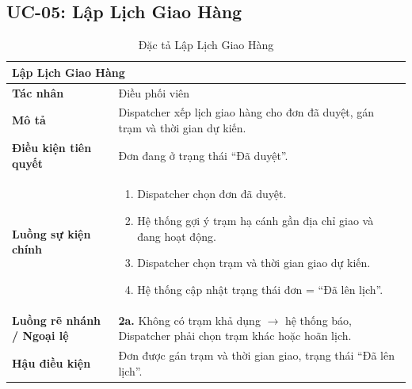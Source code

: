 \subsection{UC-05: Lập Lịch Giao Hàng}
\begin{table}[H]
  \centering
  \begin{tabularx}{\textwidth}{|l|X|}
    \hline
    \multicolumn{2}{|l|}{\textbf{Lập Lịch Giao Hàng}} \\
    \hline
    \textbf{Tác nhân}           & Điều phối viên \\ \hline
    \textbf{Mô tả}              & Dispatcher xếp lịch giao hàng cho đơn đã duyệt, gán trạm và thời gian dự kiến. \\ \hline
    \textbf{Điều kiện tiên quyết} & Đơn đang ở trạng thái ``Đã duyệt''. \\ \hline
    \textbf{Luồng sự kiện chính} &
      \begin{enumerate}[leftmargin=*, nosep, topsep=0pt]
        \item Dispatcher chọn đơn đã duyệt.
        \item Hệ thống gợi ý trạm hạ cánh gần địa chỉ giao và đang hoạt động.
        \item Dispatcher chọn trạm và thời gian giao dự kiến.
        \item Hệ thống cập nhật trạng thái đơn = ``Đã lên lịch''.
      \end{enumerate} \\ \hline
    \textbf{Luồng rẽ nhánh / Ngoại lệ} &
      \textbf{2a.} Không có trạm khả dụng $\rightarrow$ hệ thống báo, Dispatcher phải chọn trạm khác hoặc hoãn lịch. \\ \hline
    \textbf{Hậu điều kiện}      & Đơn được gán trạm và thời gian giao, trạng thái ``Đã lên lịch''. \\
    \hline
  \end{tabularx}
  \caption{Đặc tả Lập Lịch Giao Hàng}
  \label{tab:uc05}
\end{table}

